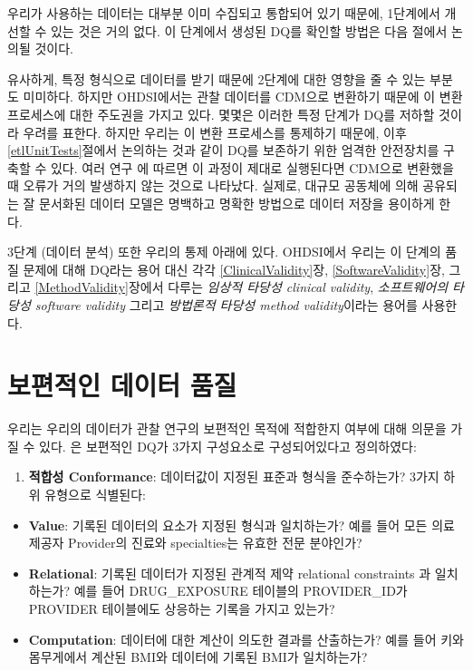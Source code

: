 \documentclass[10.5pt]{book}
\providecommand{\tightlist}{%
  \setlength{\itemsep}{0pt}\setlength{\parskip}{0pt}}
\theoremstyle{definition}
\theoremstyle{definition}
\theoremstyle{definition}
\theoremstyle{remark}
\begin{document}
우리가 사용하는 데이터는 대부분 이미 수집되고 통합되어 있기 때문에,
1단계에서 개선할 수 있는 것은 거의 없다. 이 단계에서 생성된 DQ를 확인할
방법은 다음 절에서 논의될 것이다.

유사하게, 특정 형식으로 데이터를 받기 때문에 2단계에 대한 영향을 줄 수
있는 부분도 미미하다. 하지만 OHDSI에서는 관찰 데이터를 CDM으로 변환하기
때문에 이 변환 프로세스에 대한 주도권을 가지고 있다. 몇몇은 이러한 특정
단계가 DQ를 저하할 것이라 우려를 표한다. 하지만 우리는 이 변환
프로세스를 통제하기 때문에, 이후 \ref{etlUnitTests}절에서 논의하는 것과
같이 DQ를 보존하기 위한 엄격한 안전장치를 구축할 수 있다. 여러 연구
\citep{defalco_2013, makadia_2014, matcho_2014, voss_2015, voss_2015b, hripcsak_2018}에
따르면 이 과정이 제대로 실행된다면 CDM으로 변환했을 때 오류가 거의
발생하지 않는 것으로 나타났다. 실제로, 대규모 공동체에 의해 공유되는 잘
문서화된 데이터 모델은 명백하고 명확한 방법으로 데이터 저장을 용이하게
한다.

3단계 (데이터 분석) 또한 우리의 통제 아래에 있다. OHDSI에서 우리는 이
단계의 품질 문제에 대해 DQ라는 용어 대신 각각 \ref{ClinicalValidity}장,
\ref{SoftwareValidity}장, 그리고 \ref{MethodValidity}장에서 다루는
\emph{임상적 타당성 clinical validity}, \emph{소프트웨어의 타당성
software validity} 그리고 \emph{방법론적 타당성 method validity}이라는
용어를 사용한다.

\section{보편적인 데이터 품질}\label{--}

우리는 우리의 데이터가 관찰 연구의 보편적인 목적에 적합한지 여부에 대해
의문을 가질 수 있다. \citet{kahn_harmonized_2016} 은 보편적인 DQ가 3가지
구성요소로 구성되어있다고 정의하였다:

\begin{enumerate}
\def\labelenumi{\arabic{enumi}.}
\tightlist
\item
  \textbf{적합성 Conformance}: 데이터값이 지정된 표준과 형식을
  준수하는가? 3가지 하위 유형으로 식별된다:
\end{enumerate}

\begin{itemize}
\tightlist
\item
  \textbf{Value}: 기록된 데이터의 요소가 지정된 형식과 일치하는가? 예를
  들어 모든 의료 제공자 Provider의 진료와 specialties는 유효한 전문
  분야인가?
\item
  \textbf{Relational}: 기록된 데이터가 지정된 관계적 제약 relational
  constraints 과 일치하는가? 예를 들어 DRUG\_EXPOSURE 테이블의
  PROVIDER\_ID가 PROVIDER 테이블에도 상응하는 기록을 가지고 있는가?
\item
  \textbf{Computation}: 데이터에 대한 계산이 의도한 결과를 산출하는가?
  예를 들어 키와 몸무게에서 계산된 BMI와 데이터에 기록된 BMI가
  일치하는가?
\end{itemize}
\end{document}
